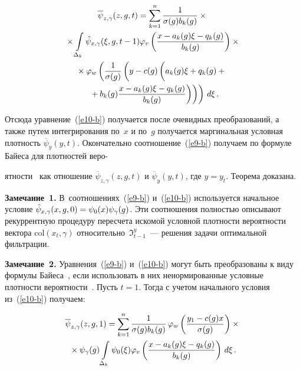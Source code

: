 \begin{multicols}{2}
\noindent
\begin{multline*}
\overline{\psi}_{z,\gamma}(z,g,t) = \sum\limits_{k=1}^n \fr{1}{\sigma(g) b_k(g)} \times{}\\
{}\times
\int\limits_{\Delta_k} \hat{\psi}_{x,\gamma} (\xi,g,t-1)\varphi_v \left( \fr{x-a_k(g)\xi-
q_k(g)}{b_k(g)}\right)\times{}\\
{}\times \varphi_w\left( \fr{1}{\sigma(g)}\left( y-c(g)\left( 
\vphantom{\fr{x-a_k(g)\xi-q_k(g)}{b_k(g)}}
a_k(g)\xi+q_k(g)+{}\right.\right.\right.\\
\left.\left.\left.{}+b_k(g) \fr{x-a_k(g)\xi-q_k(g)}{b_k(g)}\right)\right)\right)\,d\xi\,.
\end{multline*}
  
  Отсюда уравнение~(\ref{e10-b}) получается после очевидных преобразований, а также 
путем интегрирования по~$x$ и по~$g$ получается маргинальная условная плотность 
$\overline{\psi}_y(y,t)$. Окончательно соотношение~(\ref{e9-b}) получаем по формуле Байеса 
для плотностей веро-\linebreak\vspace*{-12pt}
\columnbreak

\noindent
ятности~\cite{21-b} как отношение $\overline{\psi}_{z,\gamma}(z,g,t)$ и 
$\overline{\psi}_y(y,t)$, где $y=y_t$. Теорема доказана.
  
  \smallskip
  
  \noindent
  \textbf{Замечание~1.} В~соотношениях~(\ref{e9-b}) и~(\ref{e10-b}) используется 
начальное условие $\hat{\psi}_{x,\gamma}(x,g,0)\hm = \psi_0(x)\psi_\gamma(g)$. Эти 
соотношения полностью описывают рекуррентную процедуру пересчета искомой условной 
плотности вероятности вектора $\mathrm{col}\left( x_t,\gamma\right)$ относительно~$\Im^y_{t-1}$~---
решения задачи оптимальной фильтрации.
  
  \smallskip
  
  \noindent
  \textbf{Замечание~2.} Уравнения~(\ref{e9-b}) и~(\ref{e10-b}) могут быть преобразованы к 
виду формулы Байеса~\cite{21-b}, если использовать в них ненормированные условные 
плотности вероятности~\cite{22-b}. Пусть $t=1$. Тогда с учетом начального условия 
из~(\ref{e10-b}) получаем:

\noindent
  \begin{multline*}
  \overline{\psi}_{z,\gamma}(z,g,1) =\sum\limits_{k=1}^n \displaystyle\frac{\displaystyle 1\mathstrut}{\displaystyle \sigma(g) b_k(g)\mathstrut}\,\varphi_w 
\left( \displaystyle\frac{\displaystyle y_1-c(g)x\mathstrut}{\displaystyle \sigma(g)\mathstrut}\right)\times{}\\
{}\times \psi_\gamma(g) \int\limits_{\Delta_k}\psi_0(\xi)\varphi_v 
\left(  \displaystyle\frac{\displaystyle x-a_k(g)\xi-q_k(g)\mathstrut}{\displaystyle b_k(g)\mathstrut}\right) \,d\xi\,.
  \end{multline*}
  

\end{multicols}
